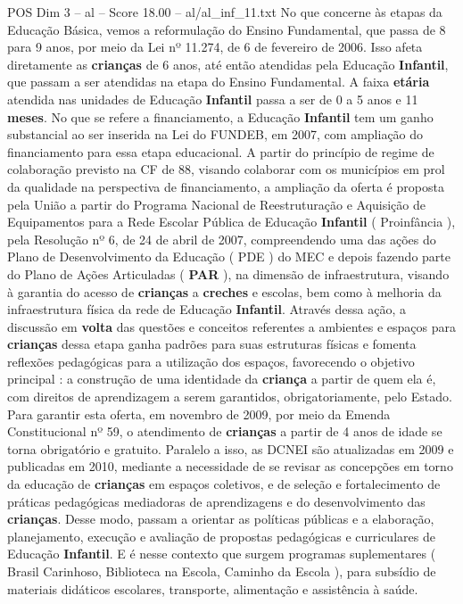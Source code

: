 \begin{textsample}{POS Dim 3 – al – Score 18.00 – al/al\_inf\_11.txt}
No que concerne às etapas da Educação Básica, vemos a reformulação do Ensino Fundamental, que passa de 8 para 9 anos, por meio da Lei nº 11.274, de 6 de fevereiro de 2006.
Isso afeta diretamente as \textbf{crianças} de 6 anos, até então atendidas pela Educação \textbf{Infantil}, que passam a ser atendidas na etapa do Ensino Fundamental.
A faixa \textbf{etária} atendida nas unidades de Educação \textbf{Infantil} passa a ser de 0 a 5 anos e 11 \textbf{meses}.
No que se refere a financiamento, a Educação \textbf{Infantil} tem um ganho substancial ao ser inserida na Lei do FUNDEB, em 2007, com ampliação do financiamento para essa etapa educacional.
A partir do princípio de regime de colaboração previsto na CF de 88, visando colaborar com os municípios em prol da qualidade na perspectiva de financiamento, a ampliação da oferta é proposta pela União a partir do Programa Nacional de Reestruturação e Aquisição de Equipamentos para a Rede Escolar Pública de Educação \textbf{Infantil} ( Proinfância ), pela Resolução nº 6, de 24 de abril de 2007, compreendendo uma das ações do Plano de Desenvolvimento da Educação ( PDE ) do MEC e depois fazendo parte do Plano de Ações Articuladas ( \textbf{PAR} ), na dimensão de infraestrutura, visando à garantia do acesso de \textbf{crianças} a \textbf{creches} e escolas, bem como à melhoria da infraestrutura física da rede de Educação \textbf{Infantil}.
Através dessa ação, a discussão em \textbf{volta} das questões e conceitos referentes a ambientes e espaços para \textbf{crianças} dessa etapa ganha padrões para suas estruturas físicas e fomenta reflexões pedagógicas para a utilização dos espaços, favorecendo o objetivo principal : a construção de uma identidade da \textbf{criança} a partir de quem ela é, com direitos de aprendizagem a serem garantidos, obrigatoriamente, pelo Estado.
Para garantir esta oferta, em novembro de 2009, por meio da Emenda Constitucional nº 59, o atendimento de \textbf{crianças} a partir de 4 anos de idade se torna obrigatório e gratuito.
Paralelo a isso, as DCNEI são atualizadas em 2009 e publicadas em 2010, mediante a necessidade de se revisar as concepções em torno da educação de \textbf{crianças} em espaços coletivos, e de seleção e fortalecimento de práticas pedagógicas mediadoras de aprendizagens e do desenvolvimento das \textbf{crianças}.
Desse modo, passam a orientar as políticas públicas e a elaboração, planejamento, execução e avaliação de propostas pedagógicas e curriculares de Educação \textbf{Infantil}.
E é nesse contexto que surgem programas suplementares ( Brasil Carinhoso, Biblioteca na Escola, Caminho da Escola ), para subsídio de materiais didáticos escolares, transporte, alimentação e assistência à saúde.

\end{textsample}
